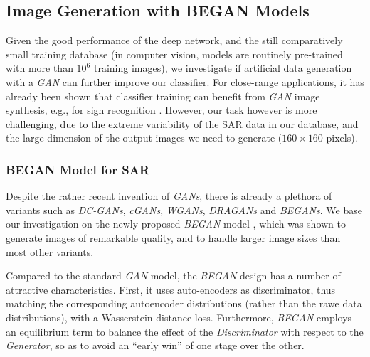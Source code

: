 \documentclass{article}
\begin{document}
\subsection{Image Generation with BEGAN Models}
%
Given the good performance of the deep network, and the still
comparatively small training database (in computer vision, models are
routinely pre-trained with more than $10^6$ training images), we
investigate if artificial data generation with a \emph{GAN}
can further improve our classifier.
%
For close-range applications, it has already been shown that
classifier training can benefit from \emph{GAN} image synthesis, e.g.,
for sign recognition \cite{wang2017adversarial}.
%
However, our task however is more challenging, due to the extreme
variability of the SAR data in our database, and the large dimension
of the output images we need to generate ($160 \times 160$ pixels).
%

\subsubsection{BEGAN Model for SAR}

Despite the rather recent invention of \emph{GANs}, there is already a
plethora of variants such as \emph{DC-GANs}, \emph{cGANs},
\emph{WGANs}, \emph{DRAGANs} and \emph{BEGANs}.
%
We base our investigation on the newly proposed \emph{BEGAN} model
\cite{berthelot2017began}, which was shown to generate images of
remarkable quality, and to handle larger image sizes than most other
variants.
%
%

\smallskip

\noindent
Compared to the standard \emph{GAN} model, the \emph{BEGAN} design has
a number of attractive characteristics. First, it uses auto-encoders
as discriminator, thus matching the corresponding autoencoder
distributions (rather than the rawe data distributions), with a
Wasserstein distance loss.
%
Furthermore, \emph{BEGAN} employs an equilibrium term to balance the
effect of the \emph{Discriminator} with respect to the
\emph{Generator}, so as to avoid an ``early win'' of one stage over
the other.

\end{document}
